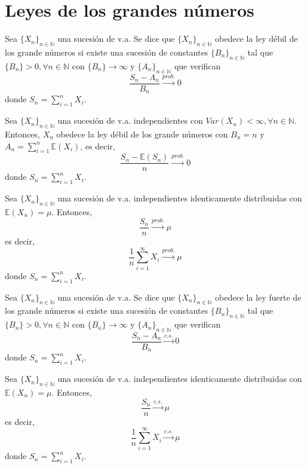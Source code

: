 \section{Leyes de los grandes números}

\begin{defn}
Sea $\{ X_n\}_{n\in\mathbb{N}}$ una sucesión de v.a.  Se dice que $\{ X_n\}_{n\in\mathbb{N}}$ obedece la ley débil de los grande números si existe una sucesión de constantes $\{ B_n\}_{n\in\mathbb{N}}$ tal que $\{ B_n\}>0, \forall n\in\mathbb{N}$ con $\{ B_n\}\rightarrow\infty$ y $\{ A_n\}_{n\in\mathbb{N}}$ que verifican \[ \frac{S_n-A_n}{B_n}\xrightarrow{prob.}0 \] donde $S_n = \sum_{i=1}^n X_i$.
\end{defn}

\begin{theo}
Sea $\{ X_n\}_{n\in\mathbb{N}}$ una sucesión de v.a. independientes con $Var(X_n) < \infty, \forall n\in\mathbb{N}$. Entonces, $X_n$ obedece la ley débil de los grande números con $B_n=n$ y $A_n = \sum_{i=1}^n \mathbb{E}(X_i)$, es decir, \[ \frac{S_n - \mathbb{E}(S_n)}{n}\xrightarrow{prob.}0 \] donde $S_n = \sum_{i=1}^n X_i$.
\end{theo}

\begin{theo}
Sea $\{ X_n\}_{n\in\mathbb{N}}$ una sucesión de v.a. independientes identicamente distribuidas con $\mathbb{E}(X_n)=\mu$. Entonces, \[ \frac{S_n}{n}\xrightarrow{prob.}\mu \] es decir, \[ \frac{1}{n}\sum_{i=1}^\infty X_i \xrightarrow{prob.}\mu \] donde $S_n = \sum_{i=1}^n X_i$.
\end{theo}

\begin{defn}
Sea $\{ X_n\}_{n\in\mathbb{N}}$ una sucesión de v.a.  Se dice que $\{ X_n\}_{n\in\mathbb{N}}$ obedece la ley fuerte de los grande números si existe una sucesión de constantes $\{ B_n\}_{n\in\mathbb{N}}$ tal que $\{ B_n\}>0, \forall n\in\mathbb{N}$ con $\{ B_n\}\rightarrow\infty$ y $\{ A_n\}_{n\in\mathbb{N}}$ que verifican \[ \frac{S_n-A_n}{B_n}\xrightarrow{c.s.}0 \] donde $S_n = \sum_{i=1}^n X_i$.
\end{defn}

\begin{theo}
Sea $\{ X_n\}_{n\in\mathbb{N}}$ una sucesión de v.a. independientes identicamente distribuidas con $\mathbb{E}(X_n)=\mu$. Entonces, \[ \frac{S_n}{n}\xrightarrow{c.s.}\mu \] es decir, \[ \frac{1}{n}\sum_{i=1}^\infty X_i \xrightarrow{c.s.}\mu \] donde $S_n = \sum_{i=1}^n X_i$.
\end{theo}

